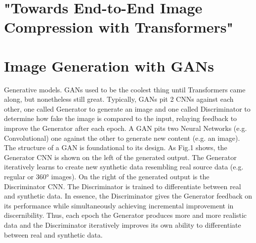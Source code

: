 

\newpage
\section{"Towards End-to-End Image Compression with Transformers"}





\section{Image Generation with GANs}

Generative models.
GANs used to be the coolest thing until Transformers came along, but nonetheless 
still great. Typically, GANs pit 2 CNNs against each other, one called Generator to 
generate an image and one called Discriminator to determine how fake the image is 
compared to the input, relaying feedback to improve the Generator after each epoch. 
A GAN pits two Neural Networks (e.g. Convolutional) one against the other to generate 
new content (e.g. an image). The structure of a GAN is foundational to its design. 
As Fig.1 shows, the Generator CNN is shown on the left of the generated output. 
The Generator iteratively learns to create new synthetic data resembling real source data 
(e.g. regular or 360° images).  On the right of the generated output is the Discriminator CNN.
The Discriminator is trained to differentiate between real and synthetic data. 
In essence, the Discriminator gives the Generator feedback on its performance while 
simultaneously achieving incremental improvement in discernibility. 
Thus, each epoch the Generator produces more and more realistic data and the Discriminator iteratively improves its own ability to differentiate between real and synthetic data.


